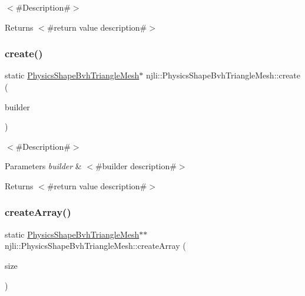 $<$\#\+Description\#$>$

\begin{DoxyReturn}{Returns}
$<$\#return value description\#$>$ 
\end{DoxyReturn}
\mbox{\label{classnjli_1_1_physics_shape_bvh_triangle_mesh_a74b16f1f34663f05bfa4b0150c12b382}} 
\subsubsection{\texorpdfstring{create()}{create()}\hspace{0.1cm}{\footnotesize\ttfamily [2/2]}}
{\footnotesize\ttfamily static \mbox{\hyperlink{classnjli_1_1_physics_shape_bvh_triangle_mesh}{Physics\+Shape\+Bvh\+Triangle\+Mesh}}$\ast$ njli\+::\+Physics\+Shape\+Bvh\+Triangle\+Mesh\+::create (\begin{DoxyParamCaption}\item[{const \mbox{\hyperlink{classnjli_1_1_physics_shape_bvh_triangle_mesh_builder}{Physics\+Shape\+Bvh\+Triangle\+Mesh\+Builder}} \&}]{builder }\end{DoxyParamCaption})\hspace{0.3cm}{\ttfamily [static]}}

$<$\#\+Description\#$>$


\begin{DoxyParams}{Parameters}
{\em builder} & $<$\#builder description\#$>$\\
\hline
\end{DoxyParams}
\begin{DoxyReturn}{Returns}
$<$\#return value description\#$>$ 
\end{DoxyReturn}
\mbox{\label{classnjli_1_1_physics_shape_bvh_triangle_mesh_a308a7517344fdd5a064f19259e01286a}} 
\subsubsection{\texorpdfstring{create\+Array()}{createArray()}}
{\footnotesize\ttfamily static \mbox{\hyperlink{classnjli_1_1_physics_shape_bvh_triangle_mesh}{Physics\+Shape\+Bvh\+Triangle\+Mesh}}$\ast$$\ast$ njli\+::\+Physics\+Shape\+Bvh\+Triangle\+Mesh\+::create\+Array (\begin{DoxyParamCaption}\item[{const \mbox{\hyperlink{_util_8h_a10e94b422ef0c20dcdec20d31a1f5049}{u32}}}]{size }\end{DoxyParamCaption})\hspace{0.3cm}{\ttfamily [static]}}


